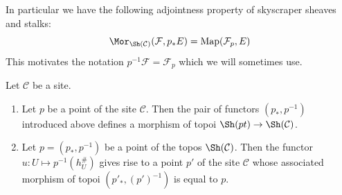 \noindent
In particular we have the following adjointness property
of skyscraper sheaves and stalks:
$$
\Mor_{\Sh(\mathcal{C})}(\mathcal{F}, p_*E)
=
\text{Map}(\mathcal{F}_p, E)
$$
This motivates the notation $p^{-1}\mathcal{F} = \mathcal{F}_p$
which we will sometimes use.

\begin{lemma}
\label{lemma-point-site-topos}
Let $\mathcal{C}$ be a site.
\begin{enumerate}
\item Let $p$ be a point of the site $\mathcal{C}$.
Then the pair of functors $(p_*, p^{-1})$ introduced
above defines a morphism of topoi
$\Sh(pt) \to \Sh(\mathcal{C})$.
\item Let $p = (p_*, p^{-1})$
be a point of the topos $\Sh(\mathcal{C})$.
Then the functor $u : U \mapsto p^{-1}(h_U^\#)$ gives
rise to a point $p'$ of the site $\mathcal{C}$
whose associated morphism of topoi $(p'_*, (p')^{-1})$
is equal to $p$.
\end{enumerate}
\end{lemma}

